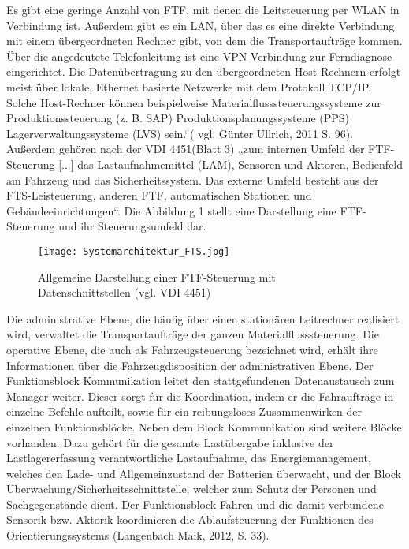 Es gibt eine geringe Anzahl von FTF, mit denen die Leitsteuerung per WLAN in Verbindung ist.
Au\ss erdem gibt es ein LAN, \"uber das es eine direkte Verbindung mit einem \"ubergeordneten Rechner gibt, von dem die Transportauftr\"age kommen.
\"Uber die angedeutete Telefonleitung ist eine VPN-Verbindung zur Ferndiagnose eingerichtet.
Die Daten\"ubertragung zu den \"ubergeordneten Host-Rechnern erfolgt meist \"uber lokale, Ethernet basierte Netzwerke mit dem Protokoll TCP/IP.
Solche Host-Rechner k\"onnen beispielweise Materialflusssteuerungssysteme zur Produktionssteuerung (z. B. SAP) Produktionsplanungssysteme (PPS) Lagerverwaltungssysteme (LVS) sein.“( vgl. G\"unter Ullrich, 2011 S. 96). 
Au\ss erdem geh\"oren nach der VDI 4451(Blatt 3) „zum internen Umfeld der FTF-Steuerung [...] das Lastaufnahmemittel (LAM), Sensoren und Aktoren, Bedienfeld am Fahrzeug und das Sicherheitssystem.
Das externe Umfeld besteht aus der FTS-Leisteuerung, anderen FTF, automatischen Stationen und Geb\"audeeinrichtungen“.
Die Abbildung 1 stellt eine Darstellung eine FTF-Steuerung und ihr Steuerungsumfeld dar.
	\begin{figure}[h!]
		\centering
		\texttt{[image: Systemarchitektur\_FTS.jpg]}
		\caption{Allgemeine Darstellung einer FTF-Steuerung mit Datenschnittstellen (vgl. VDI 4451)}
		\label{Wertschoepfungskette}
	\end{figure}
Die administrative Ebene, die h\"aufig \"uber einen station\"aren Leitrechner realisiert wird, verwaltet die Transportauftr\"age der ganzen Materialflusssteuerung.
Die operative Ebene, die auch als Fahrzeugsteuerung bezeichnet wird, erh\"alt ihre Informationen \"uber die Fahrzeugdisposition der administrativen Ebene.
Der Funktionsblock Kommunikation leitet den stattgefundenen Datenaustausch zum Manager weiter.
Dieser sorgt f\"ur die Koordination, indem er die Fahrauftr\"age in einzelne Befehle aufteilt, sowie f\"ur ein reibungsloses Zusammenwirken der einzelnen Funktionsbl\"ocke.
Neben dem Block Kommunikation sind weitere Bl\"ocke vorhanden.
Dazu geh\"ort f\"ur die gesamte Last\"ubergabe inklusive der Lastlagererfassung verantwortliche Lastaufnahme, das Energiemanagement, welches den Lade- und Allgemeinzustand der Batterien \"uberwacht, und der Block \"Uberwachung/Sicherheitsschnittstelle, welcher zum Schutz der Personen und Sachgegenst\"ande dient.
Der Funktionsblock Fahren und die damit verbundene Sensorik bzw. Aktorik koordinieren die Ablaufsteuerung der Funktionen des Orientierungssystems (Langenbach Maik, 2012, S. 33).

